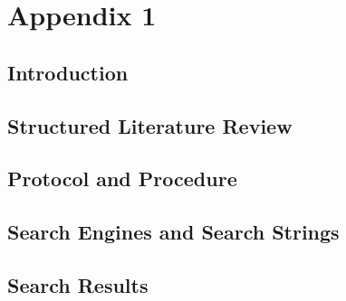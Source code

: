 
\chapter{Appendix 1}
\label{appendix:slrreport}
\section{Introduction}


\section{Structured Literature Review}


\section{Protocol and Procedure}


\section{Search Engines and Search Strings}


\section{Search Results}


\clearpage

